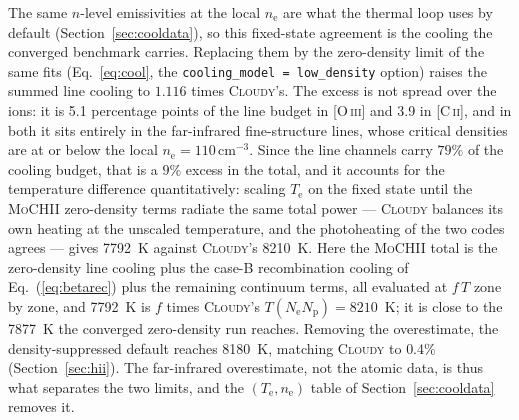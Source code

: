 \documentclass[twocolumn,linenumbers]{aastex702}
\newcommand{\code}[1]{\texttt{#1}}
\newcommand{\MoCHII}{\textsc{MoCHII}}
\newcommand{\Te}{T_{\mathrm{e}}}
\newcommand{\nelec}{n_{\mathrm{e}}}
\begin{document}
The same $n$-level emissivities at the local $\nelec$ are what the thermal
loop uses by default (Section~\ref{sec:cooldata}), so this fixed-state
agreement is the cooling the converged benchmark carries.  Replacing them
by the zero-density limit of the same fits (Eq.~\ref{eq:cool}, the
\code{cooling\_model = low\_density} option) raises the summed line cooling
to $1.116$ times \textsc{Cloudy}'s.  The excess is not spread over the
ions: it is 5.1 percentage points of the line budget in [O\,\textsc{iii}]
and 3.9 in [C\,\textsc{ii}], and in both it sits entirely in the
far-infrared fine-structure lines, whose critical densities are at or below
the local $\nelec = 110\,\mathrm{cm^{-3}}$.  Since the line channels carry
$79\%$ of the cooling budget, that is a $9\%$ excess in the total, and it
accounts for the temperature difference quantitatively: scaling $\Te$ on the
fixed state until the \MoCHII{} zero-density terms radiate the same total
power --- \textsc{Cloudy} balances its own heating at the unscaled
temperature, and the photoheating of the two codes agrees --- gives
7792~K against \textsc{Cloudy}'s 8210~K.  Here the \MoCHII{} total is the
zero-density line cooling plus the case-B recombination cooling of
Eq.~(\ref{eq:betarec}) plus the remaining continuum terms, all evaluated at
$f\,T$ zone by zone, and 7792~K is $f$ times \textsc{Cloudy}'s
$T(N_{\mathrm{e}}N_{\mathrm{p}}) = 8210$~K; it is close to the 7877~K
the converged zero-density run reaches.  Removing the overestimate, the
density-suppressed default reaches 8180~K, matching \textsc{Cloudy} to
$0.4\%$ (Section~\ref{sec:hii}).  The far-infrared overestimate, not the atomic
data, is thus what separates the two limits, and the $(\Te,\nelec)$ table of
Section~\ref{sec:cooldata} removes it.
\end{document}
